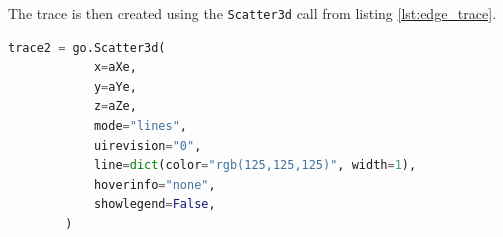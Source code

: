 The trace is then created using the \texttt{Scatter3d} call from listing \ref{lst:edge_trace}.
\begin{lstlisting}[language=python, caption={Creation of the edge trace}, label={lst:edge_trace}]
trace2 = go.Scatter3d(
            x=aXe,
            y=aYe,
            z=aZe,
            mode="lines",
            uirevision="0",
            line=dict(color="rgb(125,125,125)", width=1),
            hoverinfo="none",
            showlegend=False,
        )
    \end{lstlisting}